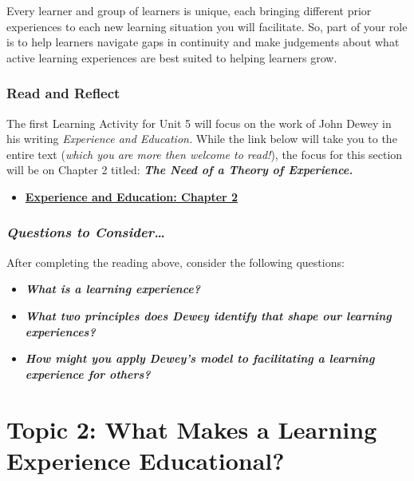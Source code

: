 \documentclass[
]{book}
\providecommand{\tightlist}{%
  \setlength{\itemsep}{0pt}\setlength{\parskip}{0pt}}
\begin{document}
Every learner and group of learners is unique, each bringing different prior experiences to each new learning situation you will facilitate. So, part of your role is to help learners navigate gaps in continuity and make judgements about what active learning experiences are best suited to helping learners grow.

\begin{reflect}
\hypertarget{read-and-reflect-4}{%
\subsubsection{Read and Reflect}\label{read-and-reflect-4}}

The first Learning Activity for Unit 5 will focus on the work of John Dewey in his writing \emph{Experience and Education.} While the link below will take you to the entire text (\emph{which you are more then welcome to read!}), the focus for this section will be on Chapter 2 titled: \textbf{\emph{The Need of a Theory of Experience.}}

\begin{itemize}
\tightlist
\item
  \href{http://ruby.fgcu.edu/courses/ndemers/colloquium/experienceducationdewey.pdf}{\textbf{Experience and Education: Chapter 2}}
\end{itemize}

\hypertarget{questions-to-consider}{%
\subsubsection{\texorpdfstring{\textbf{\emph{Questions to Consider\ldots{}}}}{Questions to Consider\ldots{}}}\label{questions-to-consider}}

After completing the reading above, consider the following questions:

\begin{itemize}
\tightlist
\item
  \textbf{\emph{What is a learning experience?}}\\
\item
  \textbf{\emph{What two principles does Dewey identify that shape our learning experiences?}}\\
\item
  \textbf{\emph{How might you apply Dewey's model to facilitating a learning experience for others?}}
\end{itemize}
\end{reflect}

\hypertarget{topic-2-what-makes-a-learning-experience-educational}{%
\section*{Topic 2: What Makes a Learning Experience Educational?}\label{topic-2-what-makes-a-learning-experience-educational}}
\end{document}
